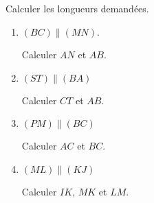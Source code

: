 
\begin{exercice}\label{exo2smath-0060}

    Calculer les longueurs demandées.


    \begin{multicols}{2}
        \begin{enumerate}
            \item

               \( (BC)\parallel (MN)\).
\begin{center}
   
\end{center}
Calculer \( AN\) et \( AB\).

\item

    \( (ST)\parallel (BA)\)

    \begin{center}

    \end{center}
    Calculer \( CT\) et \( AB\).

\item
    \( (PM)\parallel (BC)\)

\begin{center}
   
\end{center}


    Calculer \( AC\) et \( BC\).

\item

\( (ML)\parallel (KJ)\)

\begin{center}
   
\end{center}


Calculer \( IK\), \( MK\) et \( LM\).


        \end{enumerate}
    \end{multicols}

\end{exercice}
